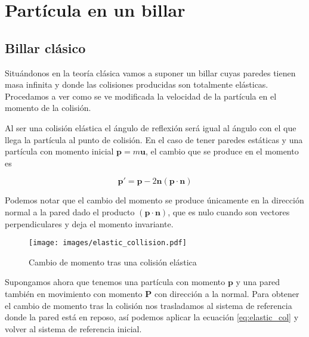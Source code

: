 %
%
%

\chapter{Partícula en un billar}

\section{Billar clásico}

Situándonos en la teoría clásica vamos a suponer un billar cuyas paredes tienen masa infinita y donde las colisiones producidas son totalmente elásticas. Procedamos a ver como se ve modificada la velocidad de la partícula en el momento de la colisión.

\vspace{3mm}

Al ser una colisión elástica el ángulo de reflexión será igual al ángulo con el que llega la partícula al punto de colisión. En el caso de tener paredes estáticas y una partícula con momento inicial \( \mathbf{p} = m\mathbf{u}\), el cambio que se produce en el momento es 

\begin{equation}\label{eq:elastic_col}
    \mathbf{p}' = \mathbf{p} - 2\mathbf{n}(\mathbf{p} \cdot \mathbf{n})
\end{equation}

Podemos notar que el cambio del momento se produce únicamente en la dirección normal a la pared dado el producto \( (\mathbf{p} \cdot \mathbf{n}) \), que es nulo cuando son vectores perpendiculares y deja el momento invariante.

\begin{figure}[H]
    \centering
    \texttt{[image: images/elastic\_collision.pdf]}
    \caption{Cambio de momento tras una colisión elástica}
    \label{fig:elastic_col}
\end{figure}

\vspace{3mm}

Supongamos ahora que tenemos una partícula con momento \( \mathbf{p} \) y una pared también en movimiento con momento \( \mathbf{P} \) con dirección a la normal. Para obtener el cambio de momento tras la colisión nos trasladamos al sistema de referencia donde la pared está en reposo, así podemos aplicar la ecuación \ref{eq:elastic_col} y volver al sistema de referencia inicial.

